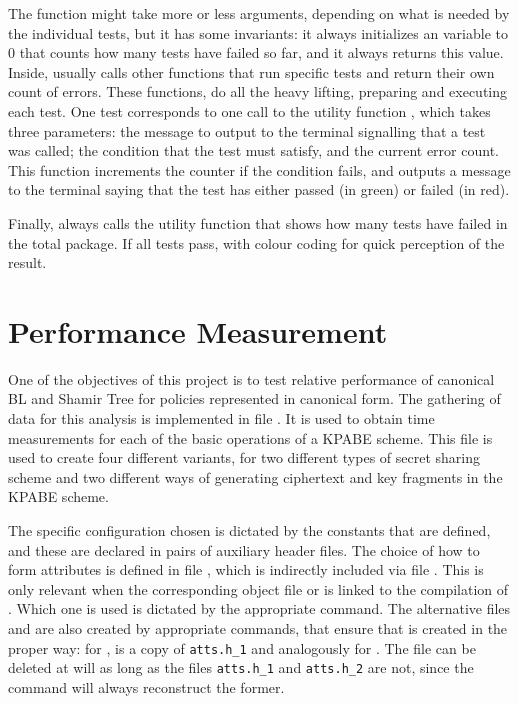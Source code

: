 \documentclass{article}
\begin{document}
The function  might take more or less arguments, depending on what is needed by the individual tests, but it has some invariants: it always initializes an variable  to $0$ that counts how many tests have failed so far, and it always returns this value. Inside,  usually calls other functions that run specific tests and return their own count of errors. These functions, do all the heavy lifting, preparing and executing each test. One test corresponds to one call to the utility function , which takes three parameters: the message to output to the terminal signalling that a test was called; the condition that the test must satisfy, and the current error count. This function increments the counter if the condition fails, and outputs a message to the terminal saying that the test has either passed (in green) or failed (in red). 

Finally,  always calls the utility function  that shows how many tests have failed in the total package. If all tests pass, with colour coding for quick perception of the result.

\section{Performance Measurement}

One of the objectives of this project is to test relative performance of canonical BL and Shamir Tree for policies represented in canonical form. The gathering of data for this analysis is implemented in file . It is used to obtain time measurements for each of the basic operations of a KPABE scheme. This file is used to create four different variants, for two different types of secret sharing scheme and two different ways of generating ciphertext and key fragments in the KPABE scheme. 

The specific configuration chosen is dictated by the constants that are defined, and these are declared in pairs of auxiliary header files. The choice of how to form attributes is defined in file , which is indirectly included via file . This is only relevant when the corresponding object file  or  is linked to the compilation of . Which one is used is dictated by the appropriate \fmake command. The alternative files  and  are also created by appropriate \fmake commands, that ensure that  is created in the proper way: for ,  is a copy of \verb|atts.h_1| and analogously for . 
The file  can be deleted at will as long as the files \verb|atts.h_1| and \verb|atts.h_2| are not, since the \fmake command will always reconstruct the former.
\end{document}
